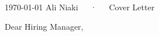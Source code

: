 \documentclass[11pt, letterpaper]{awesome-cv}
\begin{document}
\makecvheader[R]

\makecvfooter
  {\today}
  {Ali Niaki~~~·~~~Cover Letter}
  {}

\makelettertitle

\begin{cvletter}

  \begin{letterbodyen}
    Dear Hiring Manager,
    




\end{letterbodyen}
\end{cvletter}
\end{document}
